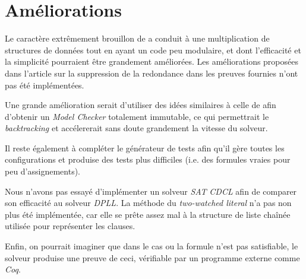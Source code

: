 \documentclass[a4paper, 10pt, french]{article}
\newcommand{\foreign}[1]{\emph{#1}}
\begin{document}
\section{Améliorations}

Le caractère extrêmement brouillon de \cite{ExplainUF} a conduit à une 
multiplication de structures de données tout en ayant un code peu modulaire, et 
dont l'efficacité et la simplicité pourraient être grandement améliorées. Les 
améliorations proposées dans l'article sur la suppression de la redondance dans 
les preuves fournies n'ont pas été implémentées.

Une grande amélioration serait d'utiliser des idées similaires à celle de 
\cite{PersistentUF} afin d'obtenir un \foreign{Model Checker} totalement 
immutable, ce qui permettrait le \foreign{backtracking} et accélererait sans 
doute grandement la vitesse du solveur.

Il reste également à compléter le générateur de tests afin qu'il gère toutes 
les configurations et produise des tests plus difficiles (i.e. des formules 
vraies pour peu d'assignements).

Nous n'avons pas essayé d'implémenter un solveur \foreign{SAT} \foreign{CDCL} 
afin de comparer son efficacité au solveur \foreign{DPLL}. La méthode du \foreign{two-watched literal} n'a pas non plus été implémentée, car elle se prête assez mal à la structure de liste chaînée utilisée pour représenter les clauses.

Enfin, on pourrait imaginer que dans le cas ou la formule n'est pas satisfiable, le solveur produise une preuve de ceci, vérifiable par un programme externe comme \foreign{Coq}.




\end{document}
